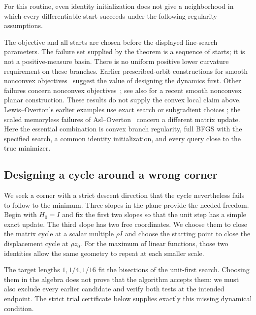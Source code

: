 For this routine, even identity initialization does not give a neighborhood
in which every differentiable start succeeds under the following regularity
assumptions.


The objective and all starts are chosen before the displayed line-search
parameters. The failure set supplied by the theorem is a sequence of starts;
it is not a positive-measure basin. There is no uniform positive lower
curvature requirement on these branches. Earlier prescribed-orbit
constructions for smooth nonconvex objectives~\cite{NEG_M04,NEG_M07}
suggest the value of designing the dynamics first. Other failures concern
nonconvex objectives~\cite{NEG_LZ15}; see also 
for a recent smooth nonconvex planar construction. These results do not
supply the convex local claim above. Lewis--Overton's earlier examples use exact search or subgradient choices
; the scaled memoryless failures
of Asl--Overton~\cite{NEG_AO21} concern a different matrix update. Here
the essential combination is convex branch regularity, full BFGS with the
specified search, a common identity initialization, and every query close
to the true minimizer.

\subsection{Designing a cycle around a wrong corner}
We seek a corner with a strict descent direction that the cycle nevertheless
fails to follow to the minimum. Three slopes in the plane provide the needed
freedom. Begin with $H_0=I$ and fix the first two slopes so that the unit step
has a simple exact update. The third slope has two free coordinates. We choose
them to close the matrix cycle at a scalar multiple $\rho I$ and choose the
starting point to close the displacement cycle at $\rho z_0$. For the maximum
of linear functions, those two identities allow the same geometry to repeat
at each smaller scale.

The target lengths $1,1/4,1/16$ fit the bisections of the unit-first search.
Choosing them in the algebra does not prove that the algorithm accepts them:
we must also exclude every earlier candidate and verify both tests at the
intended endpoint. The strict trial certificate below supplies exactly this
missing dynamical condition.

